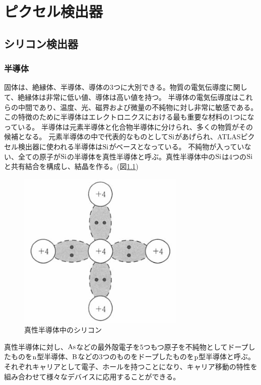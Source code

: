 \chapter{ピクセル検出器}

\section{シリコン検出器}
\subsection{半導体\cite{2-1}}
固体は、絶縁体、半導体、導体の3つに大別できる。物質の電気伝導度に関して、絶縁体は非常に低い値、導体は高い値を持つ。
半導体の電気伝導度はこれらの中間であり、温度、光、磁界および微量の不純物に対し非常に敏感である。この特徴のために半導体はエレクトロニクスにおける最も重要な材料の1つになっている。
半導体は元素半導体と化合物半導体に分けられ、多くの物質がその候補となる。
元素半導体の中で代表的なものとして$\rm{Si}$があげられ、ATLASピクセル検出器に使われる半導体は$\rm{Si}$がベースとなっている。
不純物が入っていない、全ての原子が$\rm{Si}$の半導体を真性半導体と呼ぶ。真性半導体中の$\rm{Si}$は4つの$\rm{Si}$と共有結合を構成し、結晶を作る。(図\ref{pure_silicon})

\begin{figure}[bpt]\centering
\includegraphics[width=8cm]{pure_silicon}
\caption[真性半導体中のシリコン]{真性半導体中のシリコン\cite{2-1}}
\label{pure_silicon}
\end{figure}

真性半導体に対し、$\rm{As}$などの最外殻電子を5つもつ原子を不純物としてドープしたものを$\rm{n}$型半導体、$\rm{B}$などの3つのものをドープしたものを$\rm{p}$型半導体と呼ぶ。
それぞれキャリアとして電子、ホールを持つことになり、キャリア移動の特性を組み合わせて様々なデバイスに応用することができる。

